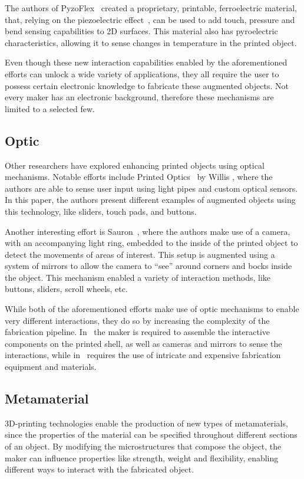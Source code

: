       The authors of PyzoFlex~\cite{Rendl:2012er} created a proprietary,
      printable, ferroelectric material, that, relying on the piezoelectric
      effect~\cite{Cady:1964fh}, can be used to add touch, pressure and bend
      sensing capabilities to 2D surfaces. This material also has pyroelectric
      characteristics, allowing it to sense changes in temperature in the
      printed object.

      Even though these new interaction capabilities enabled by the
      aforementioned efforts can unlock a wide variety of applications, they
      all require the user to possess certain electronic knowledge to fabricate
      these augmented objects. Not every maker has an electronic background,
      therefore these mechanisms are limited to a selected few.

    \subsection{Optic}
      Other researchers have explored enhancing printed objects using optical
      mechanisms. Notable efforts include Printed Optics~\cite{Willis:2012bc}
      by Willis \etal, where the authors are able to sense user input using
      light pipes and custom optical sensors. In this paper, the authors
      present different examples of augmented objects using this technology,
      like sliders, touch pads, and buttons.

      Another interesting effort is Sauron~\cite{Savage:2013kua}, where the
      authors make use of a camera, with an accompanying light ring, embedded
      to the inside of the printed object to detect the movements of areas of
      interest. This setup is augmented using a system of mirrors to allow the
      camera to  ``see'' around corners and bocks inside the object. This
      mechanism enabled a variety of interaction methods, like buttons,
      sliders, scroll wheels, etc.

      While both of the aforementioned efforts make use of optic mechanisms to
      enable very different interactions, they do so by increasing the
      complexity of the fabrication pipeline. In~\cite{Savage:2013kua} the
      maker is required to assemble the interactive components on the printed
      shell, as well as cameras and mirrors to sense the interactions, while
      in~\cite{Willis:2012bc} requires the use of intricate and expensive
      fabrication equipment and materials.

    \subsection{Metamaterial}
      3D-printing technologies enable the production of new types of
      metamaterials, since the properties of the material can be specified
      throughout different sections of an object. By modifying the
      microstructures that compose the object, the maker can influence
      properties like strength, weight and flexibility, enabling different ways
      to interact with the fabricated object.

